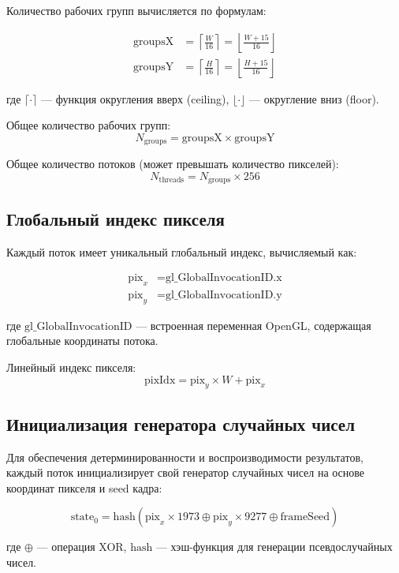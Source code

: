 \documentclass[14pt, a4paper]{extarticle}
\begin{document}
Количество рабочих групп вычисляется по формулам:

\begin{align}
\text{groupsX} &= \left\lceil \frac{W}{16} \right\rceil = \left\lfloor \frac{W + 15}{16} \right\rfloor \\
\text{groupsY} &= \left\lceil \frac{H}{16} \right\rceil = \left\lfloor \frac{H + 15}{16} \right\rfloor
\end{align}

где $\lceil \cdot \rceil$ --- функция округления вверх (ceiling), $\lfloor \cdot \rfloor$ --- округление вниз (floor).

Общее количество рабочих групп:
\[
N_{\text{groups}} = \text{groupsX} \times \text{groupsY}
\]

Общее количество потоков (может превышать количество пикселей):
\[
N_{\text{threads}} = N_{\text{groups}} \times 256
\]

\subsection{Глобальный индекс пикселя}

Каждый поток имеет уникальный глобальный индекс, вычисляемый как:

\begin{align}
\text{pix}_x &= \text{gl\_GlobalInvocationID.x} \\
\text{pix}_y &= \text{gl\_GlobalInvocationID.y}
\end{align}

где $\text{gl\_GlobalInvocationID}$ --- встроенная переменная OpenGL, содержащая глобальные координаты потока.

Линейный индекс пикселя:
\[
\text{pixIdx} = \text{pix}_y \times W + \text{pix}_x
\]

\subsection{Инициализация генератора случайных чисел}

Для обеспечения детерминированности и воспроизводимости результатов, каждый поток инициализирует свой генератор случайных чисел на основе координат пикселя и seed кадра:

\[
\text{state}_0 = \text{hash}(\text{pix}_x \times 1973 \oplus \text{pix}_y \times 9277 \oplus \text{frameSeed})
\]

где $\oplus$ --- операция XOR, $\text{hash}$ --- хэш-функция для генерации псевдослучайных чисел.
\end{document}
